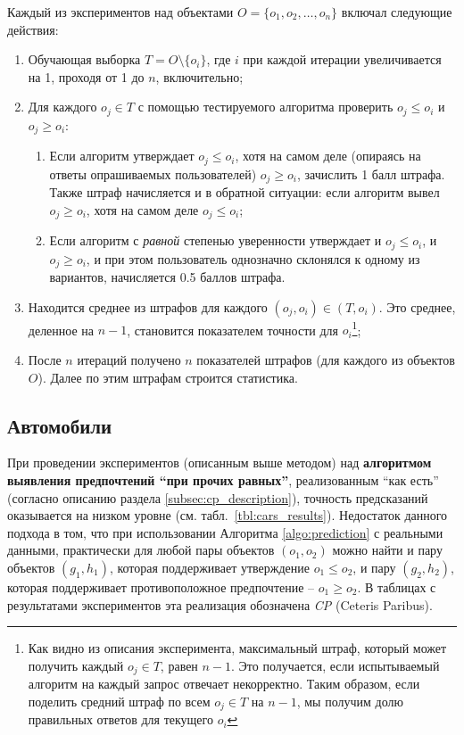 	Каждый из экспериментов над объектами $O = \{o_1, o_2, \dots, o_n\}$ включал следующие действия:
	\begin{enumerate}
		\item Обучающая выборка $T = O \setminus \{o_i\}$, где $i$ при каждой итерации увеличивается на 1, проходя от 1 до $n$, включительно;
		\item Для каждого $o_j \in T$ с помощью тестируемого алгоритма проверить $o_j \leq o_i$ и $o_j \geq o_i$:
		\begin{enumerate}
			\item Если алгоритм утверждает $o_j \leq o_i$, хотя на самом деле (опираясь на ответы опрашиваемых пользователей) $o_j \geq o_i$, зачислить 1 балл штрафа. Также штраф начисляется и в обратной ситуации: если алгоритм вывел $o_j \geq o_i$, хотя на самом деле $o_j \leq o_i$;
			\item Если алгоритм с \emph{равной} степенью уверенности утверждает и $o_j \leq o_i$, и $o_j \geq o_i$, и при этом пользователь однозначно склонялся к одному из вариантов, начисляется 0.5 баллов штрафа.
		\end{enumerate} 
		\item Находится среднее из штрафов для каждого $(o_j, o_i) \in (T, o_i)$. Это среднее, деленное на $n-1$, становится показателем точности для $o_i$\footnote{Как видно из описания эксперимента, максимальный штраф, который может получить каждый $o_j \in T$, равен $n-1$. Это получается, если испытываемый алгоритм на каждый запрос отвечает некорректно. Таким образом, если поделить средний штраф по всем $o_j \in T$ на $n-1$, мы получим долю правильных ответов для текущего $o_i$};
		\item После $n$ итераций получено $n$ показателей штрафов (для каждого из объектов $O$). Далее по этим штрафам строится статистика.
	\end{enumerate}
	
	\subsection{Автомобили}
	\label{subsec:exp_cars}
		
		При проведении экспериментов (описанным выше методом) над \textbf{алгоритмом выявления предпочтений \enquote{при прочих равных}}, реализованным ``как есть'' (согласно описанию раздела \ref{subsec:cp_description}), точность предсказаний оказывается на низком уровне (см. табл.~\ref{tbl:cars_results}).
		Недостаток данного подхода в том, что при использовании Алгоритма \ref{algo:prediction} с реальными данными, практически для любой пары объектов $(o_1,o_2)$ можно найти и пару объектов $(g_1,h_1)$, которая поддерживает утверждение $o_1 \leq o_2$, и пару $(g_2,h_2)$, которая поддерживает противоположное предпочтение – $o_1 \geq o_2$. В таблицах с результатами экспериментов эта реализация обозначена \emph{CP} (Ceteris Paribus). 
		
